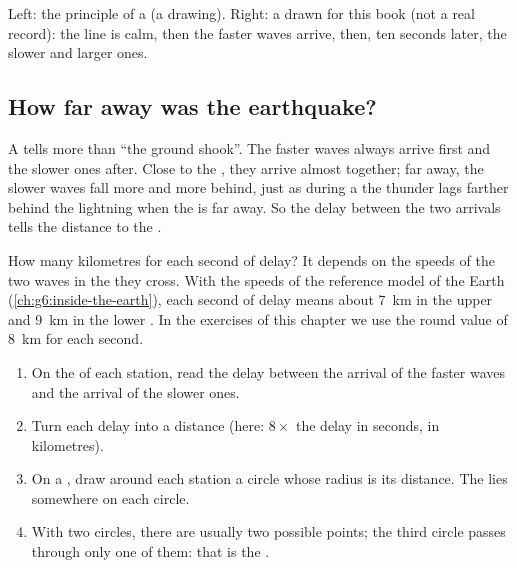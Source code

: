 \begin{omfigure}
{\small Left: the principle of a  (a drawing). Right: a
 drawn for this book (not a real record): the line is calm,
then the faster waves arrive, then, ten seconds later, the slower and
larger ones.}
\label{fig:g7:earthquakes:seismometer}
\end{omfigure}

\subsection*{How far away was the earthquake?}

A  tells more than ``the ground shook''. The faster waves always
arrive first and the slower ones after. Close to the , they arrive
almost together; far away, the slower waves fall more and more behind,
just as during a  the thunder lags farther behind the lightning when
the  is far away. So the delay between the two arrivals tells the
distance to the .

How many kilometres for each second of delay? It depends on the speeds of
the two waves in the  they cross. With the speeds of the reference
model of the Earth (\cref{ch:g6:inside-the-earth}), each second of delay
means about \qty{7}{km} in the upper  and \qty{9}{km} in the lower
. In the exercises of this chapter we use the round value of
\qty{8}{km} for each second.

\begin{method}\label{met:g7:earthquakes:three-circles}
\begin{enumerate}
  \item On the  of each station, read the delay between the
        arrival of the faster waves and the arrival of the slower ones.
  \item Turn each delay into a distance (here: $8 \times$ the delay in
        seconds, in kilometres).
  \item On a , draw around each station a circle whose radius is its
        distance. The  lies somewhere on each circle.
  \item With two circles, there are usually two possible points; the third
        circle passes through only one of them: that is the .
\end{enumerate}
\end{method}

